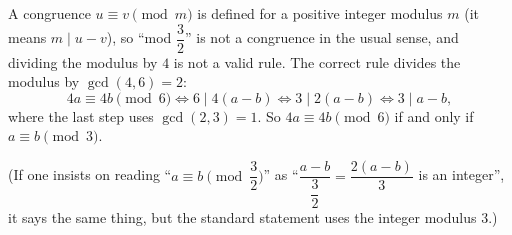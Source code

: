 A congruence $u\equiv v\pmod m$ is defined for a positive integer modulus $m$ (it means $m\mid u-v$), so ``mod $\dfrac32$'' is not a congruence in the usual sense, and dividing the modulus by $4$ is not a valid rule. The correct rule divides the modulus by $\gcd(4,6)=2$:
\[4a\equiv4b\pmod6\iff6\mid4(a-b)\iff3\mid2(a-b)\iff3\mid a-b,\]
where the last step uses $\gcd(2,3)=1$. So $4a\equiv4b\pmod6$ if and only if $\boxed{a\equiv b\pmod3}$.

(If one insists on reading ``$a\equiv b\pmod{\dfrac32}$'' as ``$\dfrac{a-b}{\dfrac32}=\dfrac{2(a-b)}3$ is an integer'', it says the same thing, but the standard statement uses the integer modulus $3$.)
